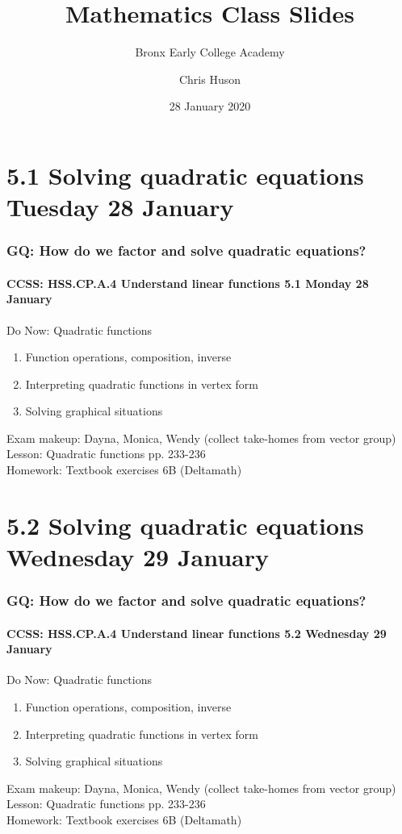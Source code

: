 \documentclass{beamer}
\title{Mathematics Class Slides}
\subtitle{Bronx Early College Academy}
\author{Chris Huson}
\date{28 January 2020}
\begin{document}
\frame{\titlepage}
\section[Outline]{}
\frame{\tableofcontents}

\section{5.1 Solving quadratic equations Tuesday 28 January}
\frame
{
  \frametitle{GQ: How do we factor and solve quadratic equations?}
  \framesubtitle{CCSS: HSS.CP.A.4 Understand linear functions \hfill \alert{5.1 Monday 28 January}}

  \begin{block}{Do Now: Quadratic functions}
    \begin{enumerate}
      \item Function operations, composition, inverse
      \item Interpreting quadratic functions in vertex form
      \item Solving graphical situations
    \end{enumerate}
    \end{block}
    Exam makeup: Dayna, Monica, Wendy (collect take-homes from vector group)
    Lesson: Quadratic functions pp. 233-236 \\ \smallskip
    Homework: Textbook exercises 6B (Deltamath)
    }

\section{5.2 Solving quadratic equations Wednesday 29 January}
\frame
{
  \frametitle{GQ: How do we factor and solve quadratic equations?}
  \framesubtitle{CCSS: HSS.CP.A.4 Understand linear functions \hfill \alert{5.2 Wednesday 29 January}}

  \begin{block}{Do Now: Quadratic functions}
    \begin{enumerate}
      \item Function operations, composition, inverse
      \item Interpreting quadratic functions in vertex form
      \item Solving graphical situations
    \end{enumerate}
    \end{block}
    Exam makeup: Dayna, Monica, Wendy (collect take-homes from vector group)
    Lesson: Quadratic functions pp. 233-236 \\ \smallskip
    Homework: Textbook exercises 6B (Deltamath)
    }
\end{document}
